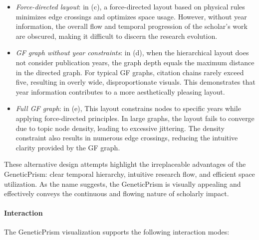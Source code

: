 \begin{itemize}
    \item \emph{Force-directed layout}: in (c), a force-directed layout based on physical rules minimizes edge crossings and optimizes space usage. However, without year information, the overall flow and temporal progression of the scholar's work are obscured, making it difficult to discern the research evolution.
    \item \emph{GF graph without year constraints}: in (d), when the hierarchical layout does not consider publication years, the graph depth equals the maximum distance in the directed graph. For typical GF graphs, citation chains rarely exceed five, resulting in overly wide, disproportionate visuals. This demonstrates that year information contributes to a more aesthetically pleasing layout.
    \item \emph{Full GF graph}: in (e), This layout constrains nodes to specific years while applying force-directed principles. In large graphs, the layout fails to converge due to topic node density, leading to excessive jittering. The density constraint also results in numerous edge crossings, reducing the intuitive clarity provided by the GF graph.
\end{itemize}

These alternative design attempts highlight the irreplaceable advantages of the GeneticPrism: clear temporal hierarchy, intuitive research flow, and efficient space utilization. As the name suggests, the GeneticPrism is visually appealing and effectively conveys the continuous and flowing nature of scholarly impact.

\paragraph{Interaction}

The GeneticPrism visualization supports the following interaction modes:

